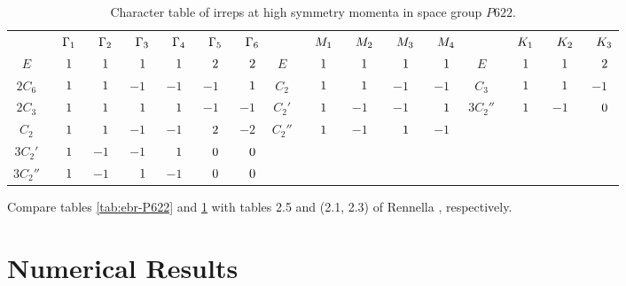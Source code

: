 \begin{table}[H]
\caption{Character table of irreps at high symmetry momenta in space group $P622$.}
\scriptsize
\centering
\begin{tabular} { c c c c c c c | c c c c c | c c c c }
\cline{1-16}
$\P$ & $\P \Gamma_1$ & $\P \Gamma_2$ & $\P \Gamma_3$ & $\P \Gamma_4$ & $\P \Gamma_5$ & $\P \Gamma_6$ & $\P$ & $\P M_1$ & $\P M_2$ & $\P M_3$ & $\P M_4$ & $\P$ & $\P K_1$ & $\P K_2$ & $\P K_3$\\
\cline{1-16}
$E$      & $\P1$ & $\P1$ & $\P1$ & $\P1$ & $\P2$ & $\P2$ & $E$     & $\P1$ & $\P1$  & $\P1$ & $\P1$ & $E$      & $\P1$ & $\P1$ & $\P2$ \\
$2C_6$   & $\P1$ & $\P1$ & $ -1$ & $ -1$ & $ -1$ & $\P1$ & $C_2$   & $\P1$ & $\P1$  & $ -1$ & $ -1$ & $C_3$    & $\P1$ & $\P1$ & $ -1$ \\
$2C_3$   & $\P1$ & $\P1$ & $\P1$ & $\P1$ & $ -1$ & $ -1$ & $C_2'$  & $\P1$ & $ -1$  & $ -1$ & $\P1$ & $3C_2''$ & $\P1$ & $ -1$ & $\P0$ \\
$C_2$    & $\P1$ & $\P1$ & $ -1$ & $ -1$ & $\P2$ & $ -2$ & $C_2''$ & $\P1$ & $ -1$  & $\P1$ & $ -1$ &          &       &       &       \\
$3C_2'$  & $\P1$ & $ -1$ & $ -1$ & $\P1$ & $\P0$ & $\P0$ &         &       &        &       &       &          &       &       &       \\
$3C_2''$ & $\P1$ & $ -1$ & $\P1$ & $ -1$ & $\P0$ & $\P0$ &         &       &        &       &       &          &       &       &       \\
\cline{1-16}
\end{tabular}
\label{tab:char-P622}
\end{table}

Compare tables \ref{tab:ebr-P622} and \ref{tab:char-P622} with tables 2.5 and (2.1, 2.3) of Rennella \cite{thesis_rennella}, respectively.

\section{Numerical Results}

